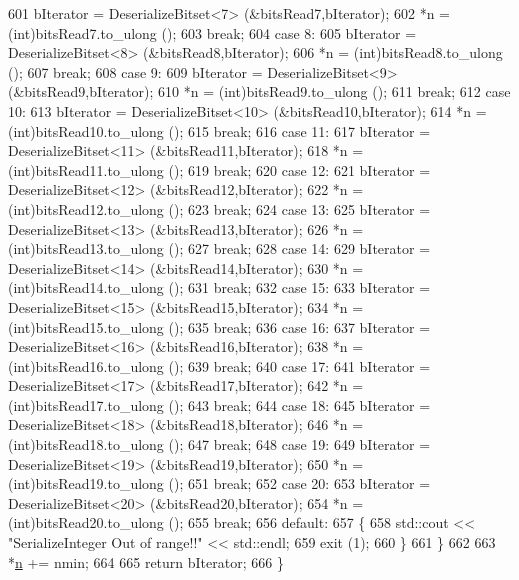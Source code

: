 \begin{DoxyCode}
601       bIterator = DeserializeBitset<7> (&bitsRead7,bIterator);
602       *n = (int)bitsRead7.to\_ulong ();
603       \textcolor{keywordflow}{break};
604     \textcolor{keywordflow}{case} 8:
605       bIterator = DeserializeBitset<8> (&bitsRead8,bIterator);
606       *n = (int)bitsRead8.to\_ulong ();
607       \textcolor{keywordflow}{break};
608     \textcolor{keywordflow}{case} 9:
609       bIterator = DeserializeBitset<9> (&bitsRead9,bIterator);
610       *n = (int)bitsRead9.to\_ulong ();
611       \textcolor{keywordflow}{break};
612     \textcolor{keywordflow}{case} 10:
613       bIterator = DeserializeBitset<10> (&bitsRead10,bIterator);
614       *n = (int)bitsRead10.to\_ulong ();
615       \textcolor{keywordflow}{break};
616     \textcolor{keywordflow}{case} 11:
617       bIterator = DeserializeBitset<11> (&bitsRead11,bIterator);
618       *n = (int)bitsRead11.to\_ulong ();
619       \textcolor{keywordflow}{break};
620     \textcolor{keywordflow}{case} 12:
621       bIterator = DeserializeBitset<12> (&bitsRead12,bIterator);
622       *n = (int)bitsRead12.to\_ulong ();
623       \textcolor{keywordflow}{break};
624     \textcolor{keywordflow}{case} 13:
625       bIterator = DeserializeBitset<13> (&bitsRead13,bIterator);
626       *n = (int)bitsRead13.to\_ulong ();
627       \textcolor{keywordflow}{break};
628     \textcolor{keywordflow}{case} 14:
629       bIterator = DeserializeBitset<14> (&bitsRead14,bIterator);
630       *n = (int)bitsRead14.to\_ulong ();
631       \textcolor{keywordflow}{break};
632     \textcolor{keywordflow}{case} 15:
633       bIterator = DeserializeBitset<15> (&bitsRead15,bIterator);
634       *n = (int)bitsRead15.to\_ulong ();
635       \textcolor{keywordflow}{break};
636     \textcolor{keywordflow}{case} 16:
637       bIterator = DeserializeBitset<16> (&bitsRead16,bIterator);
638       *n = (int)bitsRead16.to\_ulong ();
639       \textcolor{keywordflow}{break};
640     \textcolor{keywordflow}{case} 17:
641       bIterator = DeserializeBitset<17> (&bitsRead17,bIterator);
642       *n = (int)bitsRead17.to\_ulong ();
643       \textcolor{keywordflow}{break};
644     \textcolor{keywordflow}{case} 18:
645       bIterator = DeserializeBitset<18> (&bitsRead18,bIterator);
646       *n = (int)bitsRead18.to\_ulong ();
647       \textcolor{keywordflow}{break};
648     \textcolor{keywordflow}{case} 19:
649       bIterator = DeserializeBitset<19> (&bitsRead19,bIterator);
650       *n = (int)bitsRead19.to\_ulong ();
651       \textcolor{keywordflow}{break};
652     \textcolor{keywordflow}{case} 20:
653       bIterator = DeserializeBitset<20> (&bitsRead20,bIterator);
654       *n = (int)bitsRead20.to\_ulong ();
655       \textcolor{keywordflow}{break};
656     \textcolor{keywordflow}{default}:
657       \{
658         std::cout << \textcolor{stringliteral}{"SerializeInteger Out of range!!"} << std::endl;
659         exit (1);
660       \}
661     \}
662 
663   *\hyperlink{namespacesample-rng-plot_aeb5ee5c431e338ef39b7ac5431242e1d}{n} += nmin;
664 
665   \textcolor{keywordflow}{return} bIterator;
666 \}
\end{DoxyCode}


